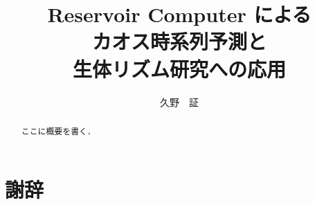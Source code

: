 \documentclass[uplatex]{suribt}
\title{Reservoir Computer による\\カオス時系列予測と\\生体リズム研究への応用}
\author{久野　証}
\begin{document}
\maketitle%

\frontmatter%
\begin{abstract}%
 ここに概要を書く．
\end{abstract}

\tableofcontents%

\mainmatter%










\cite{RODRIGUES20161}

\backmatter%
\chapter{謝辞}%


\appendix%
\chapter{}
\end{document}
